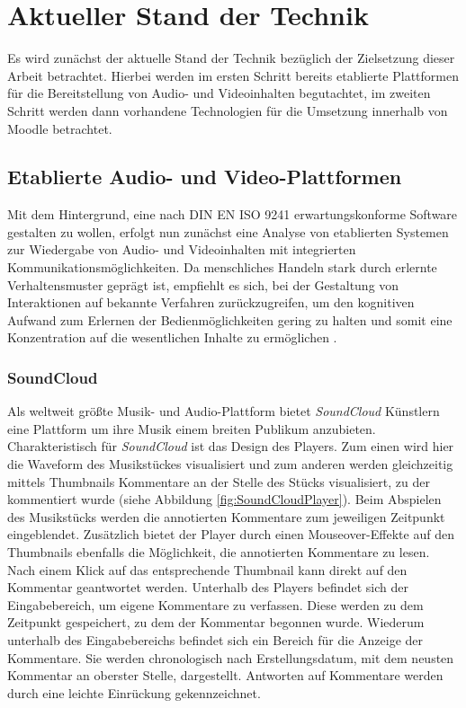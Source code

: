 
\section{Aktueller Stand der Technik}
Es wird zunächst der aktuelle Stand der Technik bezüglich der Zielsetzung dieser Arbeit betrachtet. Hierbei werden im ersten Schritt bereits etablierte Plattformen für die Bereitstellung von Audio- und Videoinhalten begutachtet, im zweiten Schritt werden dann vorhandene Technologien für die Umsetzung innerhalb von Moodle betrachtet.


\subsection{Etablierte Audio- und Video-Plattformen}

Mit dem Hintergrund, eine nach DIN EN ISO 9241 erwartungskonforme Software gestalten zu wollen, erfolgt nun zunächst eine Analyse von etablierten Systemen zur Wiedergabe von Audio- und Videoinhalten mit integrierten Kommunikationsmöglichkeiten. Da menschliches Handeln stark durch erlernte Verhaltensmuster geprägt ist, empfiehlt es sich, bei der Gestaltung von Interaktionen auf bekannte Verfahren zurückzugreifen, um den kognitiven Aufwand zum Erlernen der Bedienmöglichkeiten gering zu halten und somit eine Konzentration auf die wesentlichen Inhalte zu ermöglichen \citep{erwartungskonformitaet}.


\subsubsection{SoundCloud}

\glqq Als weltweit größte Musik- und Audio-Plattform\grqq{} \citep{soundcloudinfo} bietet \textit{SoundCloud} Künstlern eine Plattform um ihre Musik einem breiten Publikum anzubieten. Charakteristisch für \textit{SoundCloud} ist das Design des Players. Zum einen wird hier die Waveform des Musikstückes visualisiert und zum anderen werden gleichzeitig mittels Thumbnails Kommentare an der Stelle des Stücks visualisiert, zu der kommentiert wurde (siehe Abbildung \ref{fig:SoundCloudPlayer}). Beim Abspielen des Musikstücks werden die annotierten Kommentare zum jeweiligen Zeitpunkt eingeblendet. Zusätzlich bietet der Player durch einen Mouseover-Effekte auf den Thumbnails ebenfalls die Möglichkeit, die annotierten Kommentare zu lesen. Nach einem Klick auf das entsprechende Thumbnail kann direkt auf den Kommentar geantwortet werden. Unterhalb des Players befindet sich der Eingabebereich, um eigene Kommentare zu verfassen. Diese werden zu dem Zeitpunkt gespeichert, zu dem der Kommentar begonnen wurde. Wiederum unterhalb des Eingabebereichs befindet sich ein Bereich für die Anzeige der Kommentare. Sie werden chronologisch nach Erstellungsdatum, mit dem neusten Kommentar an oberster Stelle, dargestellt. Antworten auf Kommentare werden durch eine leichte Einrückung gekennzeichnet.

